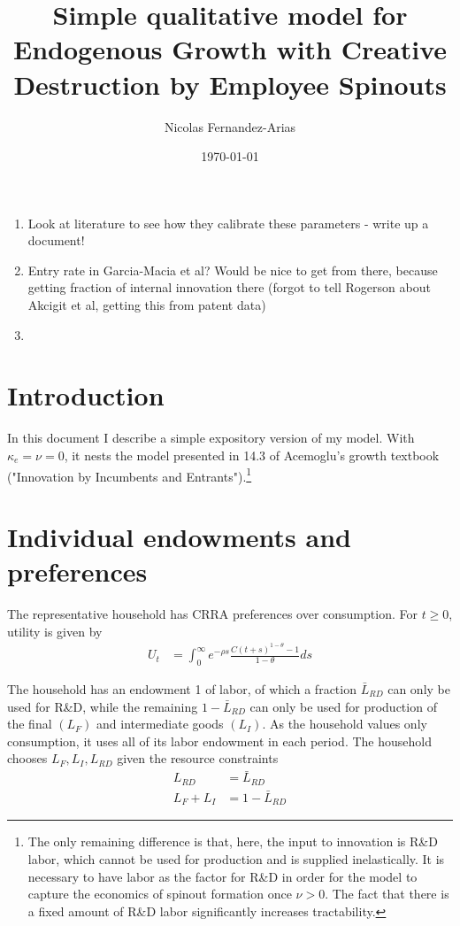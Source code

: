 \documentclass[12pt,english]{article}
\theoremstyle{remark}
\begin{document}
	
\title{Simple qualitative model for Endogenous Growth with Creative Destruction by Employee Spinouts}
\author{Nicolas Fernandez-Arias}
\date{\today}
\maketitle

\begin{enumerate}
	\item Look at literature to see how they calibrate these parameters - write up a document!
	\item Entry rate in Garcia-Macia et al? Would be nice to get from there, because getting fraction of internal innovation there (forgot to tell Rogerson about Akcigit et al, getting this from patent data)
	\item 
\end{enumerate}

\section{Introduction}

In this document I describe a simple expository version of my model.  With $\kappa_e = \nu = 0$, it nests the model presented in 14.3 of Acemoglu's growth textbook ("Innovation by Incumbents and Entrants").\footnote{The only remaining difference is that, here, the input to innovation is R\&D labor, which cannot be used for production and is supplied inelastically. It is necessary to have labor as the factor for R\&D in order for the model to capture the economics of spinout formation once $\nu > 0$. The fact that there is a fixed amount of R\&D labor significantly increases tractability.}

\section{Individual endowments and preferences}

The representative household has CRRA preferences over consumption. For $t \ge 0$, utility is given by 
\begin{align}
U_t &= \int_0^{\infty} e^{-\rho s} \frac{C(t+s)^{1-\theta} - 1}{1-\theta} ds \label{preferences}
\end{align}

The household has an endowment 1 of labor, of which a fraction $\bar{L}_{RD}$ can only be used for R\&D, while the remaining $1 - \bar{L}_{RD}$ can only be used for production of the final $(L_F)$ and intermediate goods $(L_I)$. As the household values only consumption, it uses all of its labor endowment in each period. The household chooses $L_F,L_I,L_{RD}$ given the resource constraints
\begin{align}
L_{RD} &= \bar{L}_{RD} \label{labor_resource_constraint2} \\
L_F + L_I &= 1 - \bar{L}_{RD} \label{labor_resource_constraint} 
\end{align}
\end{document}
